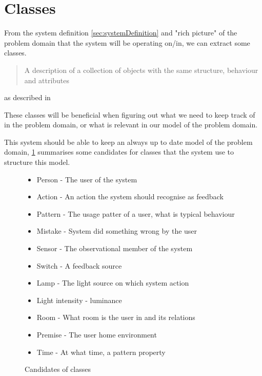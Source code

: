 \section{Classes}

From the system definition \cref{sec:systemDefinition} and "rich picture" of the problem domain that the system will be operating on/in, we can extract some classes. 

\begin{quote}
A description of a collection of objects with the same structure, behaviour and attributes
\end{quote}
as described in \cite{OOAD}

These classes will be beneficial when figuring out what we need to keep track of in the problem domain, or what is relevant in our model of the problem domain.

This system should be able to keep an always up to date model of the problem domain, \cref{lis:classes} summarises some candidates for classes that the system use to structure this model.

\begin{figure}
  \label{lis:classes}
  \begin{itemize}
    \item Person - The user of the system
    \item Action - An action the system should recognise as feedback
    \item Pattern - The usage patter of a user, what is typical behaviour
    \item Mistake - System did something wrong by the user
    \item Sensor - The observational member of the system
    \item Switch - A feedback source
    \item Lamp - The light source on which system action
    \item Light intensity - luminance
    \item Room - What room is the user in and its relations
    \item Premise - The user home environment
    \item Time - At what time, a pattern property
  \end{itemize}
  \caption{Candidates of classes}
\end{figure}

